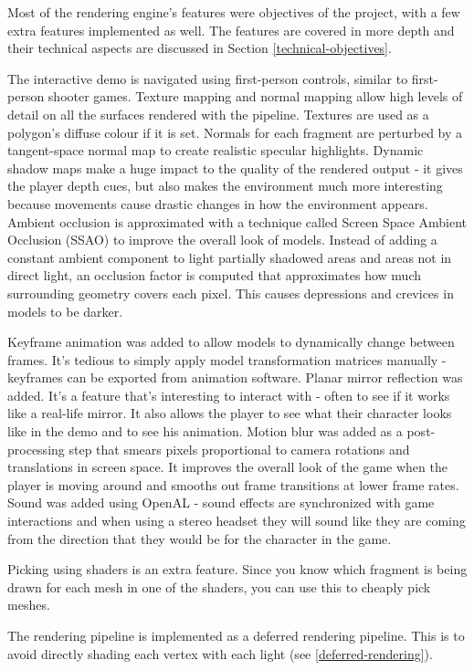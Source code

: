 \documentclass{book}
\begin{document}
    Most of the rendering engine's features were objectives of the project, with a few extra features implemented as well. The features are covered in more depth and their technical aspects are discussed in Section \ref{technical-objectives}.

    The interactive demo is navigated using first-person controls, similar to first-person shooter games.
    Texture mapping and normal mapping allow high levels of detail on all the surfaces rendered with the pipeline. Textures are used as a polygon's diffuse colour if it is set. Normals for each fragment are perturbed by a tangent-space normal map to create realistic specular highlights.
    Dynamic shadow maps make a huge impact to the quality of the rendered output - it gives the player depth cues, but also makes the environment much more interesting because movements cause drastic changes in how the environment appears.
    Ambient occlusion is approximated with a technique called Screen Space Ambient Occlusion (SSAO) to improve the overall look of models. Instead of adding a constant ambient component to light partially shadowed areas and areas not in direct light, an occlusion factor is computed that approximates how much surrounding geometry covers each pixel. This causes depressions and crevices in models to be darker.

    Keyframe animation was added to allow models to dynamically change between frames. It's tedious to simply apply model transformation matrices manually - keyframes can be exported from animation software.
    Planar mirror reflection was added. It's a feature that's interesting to interact with - often to see if it works like a real-life mirror. It also allows the player to see what their character looks like in the demo and to see his animation.
    Motion blur was added as a post-processing step that smears pixels proportional to camera rotations and translations in screen space. It improves the overall look of the game when the player is moving around and smooths out frame transitions at lower frame rates.
    Sound was added using OpenAL - sound effects are synchronized with game interactions and when using a stereo headset they will sound like they are coming from the direction that they would be for the character in the game.

    Picking using shaders is an extra feature. Since you know which fragment is being drawn for each mesh in one of the shaders, you can use this to cheaply pick meshes.

    The rendering pipeline is implemented as a deferred rendering pipeline. This is to avoid directly shading each vertex with each light (see \ref{deferred-rendering}).
\end{document}
